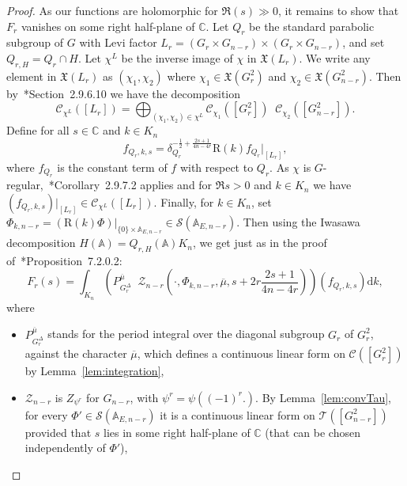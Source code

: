 \documentclass[letterpaper,11pt]{amsart}
\newcommand{\fX}{\mathfrak{X}}
\newcommand{\bA}{\mathbb{A}}
\newcommand{\C}{\mathbb{C}}
\newcommand{\cC}{\mathcal{C}}
\newcommand{\cS}{\mathcal{S}}
\newcommand{\cZ}{\mathcal{Z}}
\newcommand{\rd}{\mathrm{d}}
\newcommand{\<}{\negthickspace}
\DeclareMathOperator{\otimeshat}{\widehat{\otimes}}
\theoremstyle{definition}
\theoremstyle{plain}
\theoremstyle{remark}
\numberwithin{equation}{section}
\begin{document}
\begin{proof}
As our functions are holomorphic for $\Re(s) \gg 0$, it remains to show that
$F_r$ vanishes on some right half-plane of $\C$. Let $Q_r$ be the standard
parabolic subgroup of $G$ with Levi factor $L_r=(G_r \times G_{n-r})
\times (G_r \times G_{n-r})$, and set $Q_{r,H}=Q_r \cap H$. Let $\chi^L$ be the inverse
image of $\chi$ in $\mathfrak{X}(L_r)$. We write any element in $\fX(L_r)$
as $(\chi_1, \chi_2)$ where $\chi_1 \in \fX(G_{r}^2)$ and $\chi_2 \in
\fX(G_{n-r}^2)$. Then by~\cite{BPCZ}*{Section~2.9.6.10} we have the
decomposition
    \begin{equation}    \label{eq:decompo_cuspi}
    \cC_{\chi^L}([L_r])=\bigoplus_{(\chi_1,\chi_2) \in \chi^L}
    \mathcal{C}_{\chi_1}([G_r^2])
    \otimeshat \mathcal{C}_{\chi_2}([G_{n-r}^2]).
    \end{equation}
    Define for all $s \in \C$ and $k \in K_n$
    \begin{equation*}
    f_{Q_r,k,s} =
    \delta_{Q_r}^{-\frac{1}{2}+\frac{2s+1}{4n-4r}}
    \mathrm{R}(k) f_{Q_r}\Big|_{[L_r]},
    \end{equation*}
where $f_{Q_r}$ is the constant term of $f$ with respect to $Q_r$. As $\chi$
is $G$-regular,~\cite{BPCZ}*{Corollary~2.9.7.2} applies and for $\Re s>0$ and $k
\in K_n$ we have $(f_{Q_r,k,s})\Big|_{[L_r]} \in \mathcal{C}_{\chi^L}([L_r])$. Finally, for
$k \in K_n$, set $\Phi_{k,n-r}=(\mathrm{R}(k)\Phi)\Big|_{ \{0\} \times
\bA_{E,{n-r}}} \in \cS( \bA_{E,n-r})$. Then using the Iwasawa decomposition
$H(\bA)=Q_{r,H}(\bA)K_n$, we get just as in the proof
of~\cite{BPCZ}*{Proposition~7.2.0.2}:
    \begin{equation*}
    F_r(s)= \int_{K_n} \left( P_{G_r^\Delta}^{\overline{\mu}} \otimeshat
    \cZ_{n-r}
    \left( \cdot , \Phi_{k,n-r}, \overline{\mu},  s+2r\frac{2s+1}{4n-4r}\right)\right)
    (f_{Q_r,k,s})\rd k,
    \end{equation*}
where
\begin{itemize}
    \item $P_{G_r^\Delta}^{\overline{\mu}}$ stands for the period integral over
        the diagonal subgroup $G_r$ of $G_r^2$, against the
        character $\overline{\mu}$, which defines a continuous linear form on $\cC([G_r^2])$ by Lemma~\ref{lem:integration},

    \item $\cZ_{n-r}$ is $Z_{\psi^r}$ for
        $G_{n-r}$, with $\psi^r=\psi((-1)^{r}.)$. By Lemma~\ref{lem:convTau}, for every $\Phi' \in \cS(\bA_{E,n-r})$ it is a continuous linear form on $\mathcal{T}([G_{n-r}^2])$ provided
        that $s$ lies in some right half-plane of $\C$ (that can be chosen independently of $\Phi'$),


\end{itemize}
\end{proof}
\end{document}
